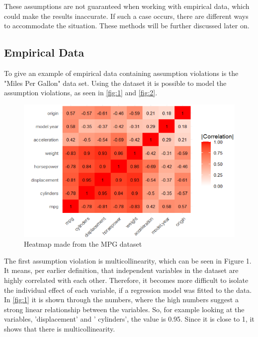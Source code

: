 \noindent These assumptions are not guaranteed when working with empirical data, which could make the results inaccurate. 
If such a case occurs, there are different ways to accommodate the situation. These methods will be further discussed later on. \newline 

 

\subsection{Empirical Data}
To give an example of empirical data containing assumption violations is the "Miles Per Gallon" data set. Using the dataset it is possible to model the assumption violations, as seen in \autoref{fig:1} and \autoref{fig:2}.
\newline

\begin{figure}
	\centering
	\centering
	\includegraphics{billder/1.png}
	\caption{Heatmap made from the MPG dataset}
	\label{fig:1}
\end{figure}

\noindent The first assumption violation is multicollinearity, which can be seen in Figure 1. It means, per earlier definition, that independent variables in the dataset are highly correlated with each other. Therefore, it becomes more difficult to isolate the individual effect of each variable, if a regression model was fitted to the data. In \autoref{fig:1} it is shown through the numbers, where the high numbers suggest a strong linear relationship between the variables. So, for example looking at the variables, 'displacement' and ' cylinders', the value is 0.95. Since it is close to 1, it shows that there is multicollinearity. \newline


